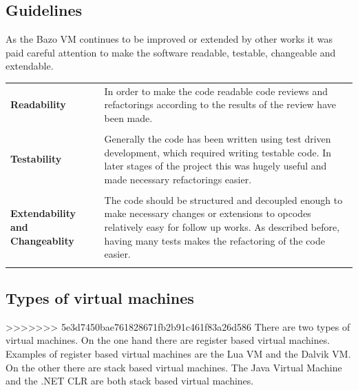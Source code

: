 \subsection{Guidelines}
As the Bazo VM continues to be improved or extended by other works it was paid careful attention to make the software readable, testable, changeable and extendable. 

\begin{tabular}[t]{ p{3cm} p{12.5cm}}
\raggedright
\textbf{Readability} &
In order to make the code readable code reviews and refactorings according to the results of the review have been made. \\ \\

\raggedright
\textbf{Testability} &
Generally the code has been written using test driven development, which required writing testable code. In later stages of the project this was hugely useful and made necessary refactorings easier. \\ \\
 
\raggedright
\textbf{Extendability and Changeablity} &
The code should be structured and decoupled enough to make necessary changes or extensions to opcodes relatively easy for follow up works. As described before, having many tests makes the refactoring of the code easier. \\ \\ 

\end{tabular}


\subsection{Types of virtual machines}
>>>>>>> 5e3d7450bae761828671fb2b91c461f83a26d586
There are two types of virtual machines. On the one hand there are register based virtual machines. Examples of register based virtual machines are the Lua VM and the Dalvik VM. On the other there are stack based virtual machines. The Java Virtual Machine and the .NET CLR are both stack based virtual machines. \cite{stackvsregistervm}

